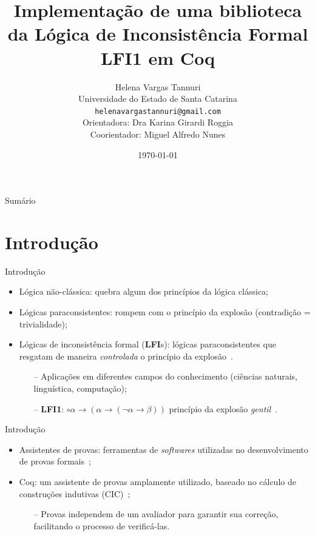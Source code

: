\documentclass[table]{beamer}
\title[]{Implementação de uma biblioteca da Lógica de Inconsistência Formal LFI1 em Coq}
\author[Helena Vargas Tannuri]{
    Helena Vargas Tannuri\\\smallskip
    {\scriptsize Universidade do Estado de Santa Catarina \\\smallskip
    \vspace{-2mm}
    \texttt{helenavargastannuri@gmail.com}\\\medskip
    {Orientadora: Dra Karina Girardi Roggia}\\
    {Coorientador: Miguel Alfredo Nunes}
    }
}
\date{\today}
\newcommand{\lfium}{{\normalfont\textbf{LFI1}}}
\newcommand{\lfis}{{\normalfont\textbf{LFI}s}}
\begin{document}
    \begin{frame}
        \titlepage
    \end{frame}

    \begin{frame}[allowframebreaks]{Sumário}
        \tableofcontents
    \end{frame}

\section[]{Introdução}
    \begin{frame}{Introdução}
        \begin{itemize}
            \item Lógica não-clássica: quebra algum dos princípios da lógica clássica;
            \item Lógicas paraconsistentes: rompem com o princípio da explosão (contradição = trivialidade);
            \item Lógicas de inconsistência formal (\lfis{}): lógicas paraconsistentes que resgatam de maneira \textit{controlada} o princípio da explosão~\cite{Carnielli_Coniglio_2016}.
            \begin{itemize}
                \item[--] Aplicações em diferentes campos do conhecimento (ciências naturais, linguística, computação);
                \item[--] \lfium{}: $\circ \alpha \to (\alpha \to (\neg \alpha \to \beta))$ princípio da explosão \textit{gentil}~\cite{carnielli2000formal}.
            \end{itemize}
        \end{itemize}
    \end{frame}

    \begin{frame}{Introdução}
        \begin{itemize}
            \item Assistentes de provas: ferramentas de \textit{softwares} utilizadas no desenvolvimento de provas formais~\cite{Chlipala_2013};
            \item Coq: um assistente de provas amplamente utilizado, baseado no cálculo de construções indutivas (CIC)~\cite{silva2019certificaccao};
            \begin{itemize}
                \item[--] Provas independem de um avaliador para garantir sua correção, facilitando o processo de verificá-las.
            \end{itemize}
        \end{itemize}
    \end{frame}
\end{document}
